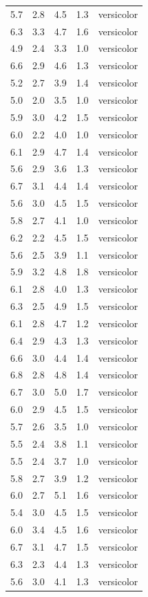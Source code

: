 \documentclass[
  letterpaper,
  DIV=11,
  numbers=noendperiod,
  oneside]{scrreprt}
\begin{document}
\begin{longtable}[]{@{}rrrrl@{}}
5.7 & 2.8 & 4.5 & 1.3 & versicolor \\
6.3 & 3.3 & 4.7 & 1.6 & versicolor \\
4.9 & 2.4 & 3.3 & 1.0 & versicolor \\
6.6 & 2.9 & 4.6 & 1.3 & versicolor \\
5.2 & 2.7 & 3.9 & 1.4 & versicolor \\
5.0 & 2.0 & 3.5 & 1.0 & versicolor \\
5.9 & 3.0 & 4.2 & 1.5 & versicolor \\
6.0 & 2.2 & 4.0 & 1.0 & versicolor \\
6.1 & 2.9 & 4.7 & 1.4 & versicolor \\
5.6 & 2.9 & 3.6 & 1.3 & versicolor \\
6.7 & 3.1 & 4.4 & 1.4 & versicolor \\
5.6 & 3.0 & 4.5 & 1.5 & versicolor \\
5.8 & 2.7 & 4.1 & 1.0 & versicolor \\
6.2 & 2.2 & 4.5 & 1.5 & versicolor \\
5.6 & 2.5 & 3.9 & 1.1 & versicolor \\
5.9 & 3.2 & 4.8 & 1.8 & versicolor \\
6.1 & 2.8 & 4.0 & 1.3 & versicolor \\
6.3 & 2.5 & 4.9 & 1.5 & versicolor \\
6.1 & 2.8 & 4.7 & 1.2 & versicolor \\
6.4 & 2.9 & 4.3 & 1.3 & versicolor \\
6.6 & 3.0 & 4.4 & 1.4 & versicolor \\
6.8 & 2.8 & 4.8 & 1.4 & versicolor \\
6.7 & 3.0 & 5.0 & 1.7 & versicolor \\
6.0 & 2.9 & 4.5 & 1.5 & versicolor \\
5.7 & 2.6 & 3.5 & 1.0 & versicolor \\
5.5 & 2.4 & 3.8 & 1.1 & versicolor \\
5.5 & 2.4 & 3.7 & 1.0 & versicolor \\
5.8 & 2.7 & 3.9 & 1.2 & versicolor \\
6.0 & 2.7 & 5.1 & 1.6 & versicolor \\
5.4 & 3.0 & 4.5 & 1.5 & versicolor \\
6.0 & 3.4 & 4.5 & 1.6 & versicolor \\
6.7 & 3.1 & 4.7 & 1.5 & versicolor \\
6.3 & 2.3 & 4.4 & 1.3 & versicolor \\
5.6 & 3.0 & 4.1 & 1.3 & versicolor \\

\end{longtable}
\end{document}
